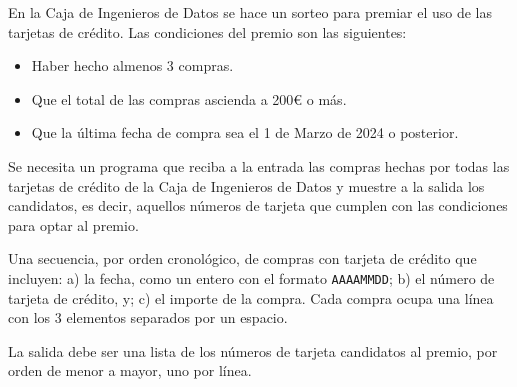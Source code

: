 
\Statement

En la Caja de Ingenieros de Datos se hace un sorteo para premiar el uso de las tarjetas de crédito. Las condiciones del premio son las siguientes:
\begin{itemize}
    \item Haber hecho almenos 3 compras.
    \item Que el total de las compras ascienda a 200€ o más.
    \item Que la última fecha de compra sea el 1 de Marzo de 2024 o posterior.
\end{itemize}

\medskip

Se necesita un programa que reciba a la entrada las compras hechas por todas las tarjetas de crédito de la Caja de Ingenieros de Datos y muestre a la salida los candidatos, es decir, aquellos números de tarjeta que cumplen con las condiciones para optar al premio.

\Input

Una secuencia, por orden cronológico, de compras con tarjeta de crédito que incluyen: a) la fecha, como un entero con el formato \verb|AAAAMMDD|; b) el número de tarjeta de crédito, y; c) el importe de la compra. Cada compra ocupa una línea con los 3 elementos separados por un espacio.

\Output

La salida debe ser una lista de los números de tarjeta candidatos al premio, por orden de menor a mayor, uno por línea.

\Sample



